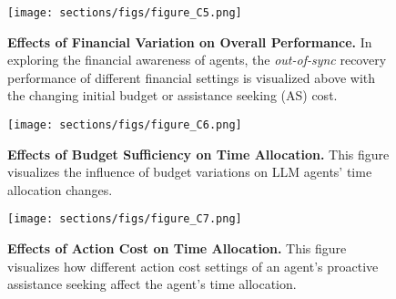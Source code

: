 \begin{figure}
\begin{center}
\begin{small}
    \texttt{[image: sections/figs/figure\_C5.png]}
    \caption{\textbf{Effects of Financial Variation on Overall Performance.} In exploring the financial awareness of agents, the \textit{out-of-sync} recovery performance of different financial settings is visualized above with the changing initial budget or assistance seeking (AS) cost.}
    \vspace{-1em}
    \label{fig:figure C5 (cost awareness - performance)}
\end{small}
\end{center}
\end{figure}



\begin{figure}
\begin{center}
\begin{small}
    \texttt{[image: sections/figs/figure\_C6.png]}
    \caption{\textbf{Effects of Budget Sufficiency on Time Allocation.} This figure visualizes the influence of budget variations on LLM agents' time allocation changes.}
    \label{fig:figure C6 (budget awareness - allocation)}
\end{small}
\end{center}
\end{figure}



\begin{figure}
\begin{center}
\begin{small}
    \texttt{[image: sections/figs/figure\_C7.png]}
    \caption{\textbf{Effects of Action Cost on Time Allocation.} This figure visualizes how different action cost settings of an agent's proactive assistance seeking affect the agent's time allocation.}
    \label{fig:figure C7 (cost awareness - allocation)}
\end{small}
\end{center}
\end{figure}






